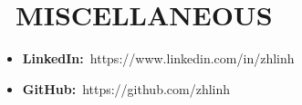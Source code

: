 \documentclass{resume}
\begin{document}
\section{\faEnvelopeO\ MISCELLANEOUS}
\begin{itemize}[parsep=0.5ex]
  \item \textbf{LinkedIn:}\ https://www.linkedin.com/in/zhlinh
  \item \textbf{GitHub:}\ https://github.com/zhlinh
\end{itemize}

%
%
\end{document}
